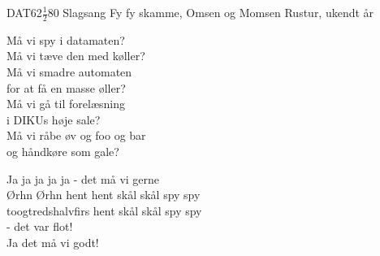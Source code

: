 \begin{song}{DAT62$\frac{1}{2}$80 Slagsang}
  {} %
  {Fy fy skamme, Omsen og Momsen} %
  {} %
  {Rustur, ukendt år} %
  {\NotCCLIed} %

  \begin{SBVerse}
    Må vi spy i datamaten?\\
    Må vi tæve den med køller?\\
    Må vi smadre automaten\\
    for at få en masse øller?\\
    Må vi gå til forelæsning\\
    i DIKUs høje sale?\\
    Må vi råbe øv og foo og bar\\
    og håndkøre som gale?
  \end{SBVerse}

  \begin{SBChorus}
    Ja ja ja ja ja - det må vi gerne\\
    Ørhn Ørhn hent hent skål skål spy spy\\
    toogtredshalvfirs hent skål skål spy spy\\
    - det var flot!\\
    \medskip
    Ja det må vi godt!
  \end{SBChorus}

  \begin{SBSection*}
  \end{SBSection*}
\end{song}